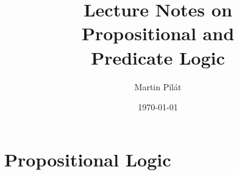 \documentclass[a4paper,nofonts,nohyper,justified,colorinlistoftodos,hidelinks]{tufte-book}
\title{Lecture Notes on \\ Propositional and \\ Predicate Logic}
\author{Martin Pilát}
\date{\today}
\begin{document}
\maketitle

\mainmatter



\part{Propositional Logic}



\backmatter

\setcounter{tocdepth}{2}
\tableofcontents
\listoffigures
\listoftables
\listofalgorithms 
\listoftodos
\end{document}
